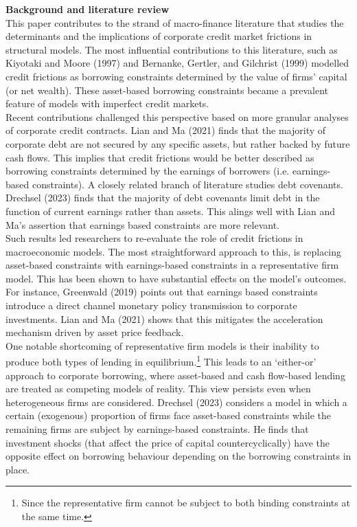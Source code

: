 \documentclass[12pt]{article}
\begin{document}
\textbf{Background and literature review} \\
This paper contributes to the strand of macro-finance literature that studies the determinants and the implications of corporate credit market frictions in structural models. The most influential contributions to this literature, such as Kiyotaki and Moore (1997) and Bernanke, Gertler, and Gilchrist (1999) modelled credit frictions as borrowing constraints determined by the value of firms' capital (or net wealth). These asset-based borrowing constraints became a prevalent feature of models with imperfect credit markets.  \vspace{3mm} \\ 
Recent contributions challenged this perspective based on more granular analyses of corporate credit contracts. Lian and Ma (2021) finds that the majority of corporate debt are not secured by any specific assets, but rather backed by future cash flows. This implies that credit frictions would be better described as borrowing constraints determined by the earnings of borrowers (i.e. earnings-based constraints). A closely related branch of literature studies debt covenants. Drechsel (2023) finds that the majority of debt covenants limit debt in the function of current earnings rather than assets. This alings well with Lian and Ma's assertion that earnings based constraints are more relevant. \vspace{3mm} \\
Such results led researchers to re-evaluate the role of credit frictions in macroeconomic models. The most straightforward approach to this, is replacing asset-based constraints with earnings-based constraints in a representative firm model. This has been shown to have substantial effects on the model's outcomes. For instance, Greenwald (2019) points out that earnings based constraints introduce a direct channel monetary policy transmission to corporate investments. Lian and Ma (2021) shows that this mitigates the acceleration mechanism driven by asset price feedback. \vspace{3mm} \\
One notable shortcoming of representative firm models is their inability to produce both types of lending in equilibrium.\footnote{Since the representative firm cannot be subject to both binding constraints at the same time.} This leads to an `either-or' approach to corporate borrowing, where asset-based and cash flow-based lending are treated as competing models of reality. This view persists even when heterogeneous firms are considered. Drechsel (2023) considers a model in which a certain (exogenous) proportion of firms face asset-based constraints while the remaining firms are subject by earnings-based constraints. He finds that investment shocks (that affect the price of capital countercyclically) have the opposite effect on borrowing behaviour depending on the borrowing constraints in place.\vspace{3mm} \\ 
\end{document}
